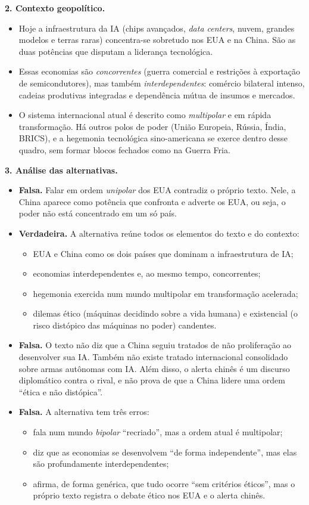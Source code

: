 \documentclass{article}%
\begin{document}
\textbf{2. Contexto geopolítico.}
\begin{itemize}
  \item Hoje a infraestrutura da IA (chips avançados, \emph{data centers}, nuvem, grandes modelos e terras raras) concentra-se sobretudo nos EUA e na China. São as duas potências que disputam a liderança tecnológica.
  \item Essas economias são \emph{concorrentes} (guerra comercial e restrições à exportação de semicondutores), mas também \emph{interdependentes}: comércio bilateral intenso, cadeias produtivas integradas e dependência mútua de insumos e mercados.
  \item O sistema internacional atual é descrito como \emph{multipolar} e em rápida transformação. Há outros polos de poder (União Europeia, Rússia, Índia, BRICS), e a hegemonia tecnológica sino-americana se exerce dentro desse quadro, sem formar blocos fechados como na Guerra Fria.
\end{itemize}

\textbf{3. Análise das alternativas.}
\begin{itemize}
  \item[(a)] \textbf{Falsa.} Falar em ordem \emph{unipolar} dos EUA contradiz o próprio texto. Nele, a China aparece como potência que confronta e adverte os EUA, ou seja, o poder não está concentrado em um só país.
  \item[(b)] \textbf{Verdadeira.} A alternativa reúne todos os elementos do texto e do contexto:
  \begin{itemize}
    \item EUA e China como os dois países que dominam a infraestrutura de IA;
    \item economias interdependentes e, ao mesmo tempo, concorrentes;
    \item hegemonia exercida num mundo multipolar em transformação acelerada;
    \item dilemas ético (máquinas decidindo sobre a vida humana) e existencial (o risco distópico das máquinas no poder) candentes.
  \end{itemize}
  \item[(c)] \textbf{Falsa.} O texto não diz que a China seguiu tratados de não proliferação ao desenvolver sua IA. Também não existe tratado internacional consolidado sobre armas autônomas com IA. Além disso, o alerta chinês é um discurso diplomático contra o rival, e não prova de que a China lidere uma ordem ``ética e não distópica''.
  \item[(d)] \textbf{Falsa.} A alternativa tem três erros:
  \begin{itemize}
    \item fala num mundo \emph{bipolar} ``recriado'', mas a ordem atual é multipolar;
    \item diz que as economias se desenvolvem ``de forma independente'', mas elas são profundamente interdependentes;
    \item afirma, de forma genérica, que tudo ocorre ``sem critérios éticos'', mas o próprio texto registra o debate ético nos EUA e o alerta chinês.
  \end{itemize}
\end{itemize}
\end{document}
